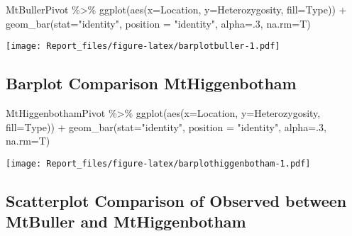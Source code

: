 \documentclass[
]{article}
\newenvironment{Shaded}{\begin{snugshade}}{\end{snugshade}}
\newcommand{\AttributeTok}[1]{\textcolor[rgb]{0.77,0.63,0.00}{#1}}
\newcommand{\DecValTok}[1]{\textcolor[rgb]{0.00,0.00,0.81}{#1}}
\newcommand{\FunctionTok}[1]{\textcolor[rgb]{0.00,0.00,0.00}{#1}}
\newcommand{\NormalTok}[1]{#1}
\newcommand{\SpecialCharTok}[1]{\textcolor[rgb]{0.00,0.00,0.00}{#1}}
\newcommand{\StringTok}[1]{\textcolor[rgb]{0.31,0.60,0.02}{#1}}
\begin{document}
\begin{Shaded}
\begin{Highlighting}[]
\NormalTok{MtBullerPivot }\SpecialCharTok{\%\textgreater{}\%}
  \FunctionTok{ggplot}\NormalTok{(}\FunctionTok{aes}\NormalTok{(}\AttributeTok{x=}\NormalTok{Location, }\AttributeTok{y=}\NormalTok{Heterozygosity, }\AttributeTok{fill=}\NormalTok{Type)) }\SpecialCharTok{+} \FunctionTok{geom\_bar}\NormalTok{(}\AttributeTok{stat=}\StringTok{"identity"}\NormalTok{, }\AttributeTok{position =} \StringTok{"identity"}\NormalTok{, }\AttributeTok{alpha=}\NormalTok{.}\DecValTok{3}\NormalTok{, }\AttributeTok{na.rm=}\NormalTok{T)}
\end{Highlighting}
\end{Shaded}

\texttt{[image: Report\_files/figure-latex/barplotbuller-1.pdf]}

\hypertarget{barplot-comparison-mthiggenbotham}{%
\subsection{Barplot Comparison
MtHiggenbotham}\label{barplot-comparison-mthiggenbotham}}

\begin{Shaded}
\begin{Highlighting}[]
\NormalTok{MtHiggenbothamPivot }\SpecialCharTok{\%\textgreater{}\%}
  \FunctionTok{ggplot}\NormalTok{(}\FunctionTok{aes}\NormalTok{(}\AttributeTok{x=}\NormalTok{Location, }\AttributeTok{y=}\NormalTok{Heterozygosity, }\AttributeTok{fill=}\NormalTok{Type)) }\SpecialCharTok{+} \FunctionTok{geom\_bar}\NormalTok{(}\AttributeTok{stat=}\StringTok{"identity"}\NormalTok{, }\AttributeTok{position =} \StringTok{"identity"}\NormalTok{, }\AttributeTok{alpha=}\NormalTok{.}\DecValTok{3}\NormalTok{, }\AttributeTok{na.rm=}\NormalTok{T)}
\end{Highlighting}
\end{Shaded}

\texttt{[image: Report\_files/figure-latex/barplothiggenbotham-1.pdf]}

\hypertarget{scatterplot-comparison-of-observed-between-mtbuller-and-mthiggenbotham}{%
\subsection{Scatterplot Comparison of Observed between MtBuller and
MtHiggenbotham}\label{scatterplot-comparison-of-observed-between-mtbuller-and-mthiggenbotham}}
\end{document}
